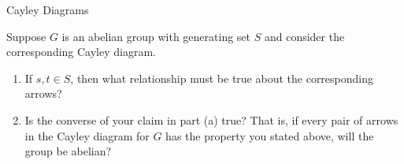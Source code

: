 \begin{section}{Cayley Diagrams}
\begin{problem}
Suppose $G$ is an abelian group with generating set $S$ and consider the corresponding Cayley diagram.
\begin{enumerate}[label=\textrm{(\alph*)}]
\item If $s,t\in S$, then what relationship must be true about the corresponding arrows?
\item Is the converse of your claim in part (a) true?  That is, if every pair of arrows in the Cayley diagram for $G$ has the property you stated above, will the group be abelian?
\end{enumerate}
\end{problem}

\end{section}